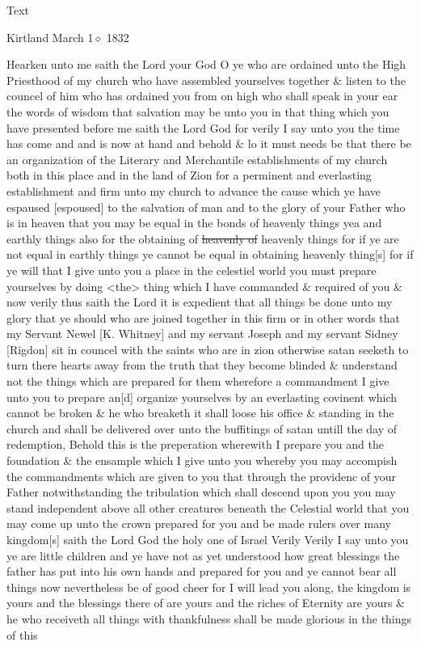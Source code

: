 			\begin{description}
				\item[Text]
			\end{description}
			
				\begin{tightcenter}
				Kirtland March 1$\diamond$ 1832
				\end{tightcenter}
				
				Hearken unto me saith the Lord your God O ye who are ordained unto the High Priesthood of my church who have assembled yourselves together \& listen to the councel of him who has ordained you from on high who shall speak in your ear the words of wisdom that salvation may be unto you in that thing which you have presented before me saith the Lord God for verily I say unto you the time has come and and is now at hand and behold \& lo it must needs be that there be an organization of the Literary and Merchantile establishments of my church both in this place and in the land of Zion for a perminent and everlasting establishment and firm unto my church to advance the cause which ye have espaused [espoused] to the salvation of man and to the glory of your Father who is in heaven that you may be equal in the bonds of heavenly things yea and earthly things also for the obtaining of \sout{heavenly of} heavenly things for if ye are not equal in earthly things ye cannot be equal in obtaining heavenly thing[s] for if ye will that I give unto you a place in the celestiel world you must prepare yourselves by doing <the> thing which I have commanded \& required of you \& now verily thus saith the Lord it is expedient that all things be done unto my glory that ye should who are joined together in this firm or in other words that my Servant Newel [K. Whitney] and my servant Joseph and my servant Sidney [Rigdon] sit in councel with the saints who are in zion otherwise satan seeketh to turn there hearts away from the truth that they become blinded \& understand not the things which are prepared for them wherefore a commandment I give unto you to prepare an[d] organize yourselves by an everlasting covinent which cannot be broken \& he who breaketh it shall loose his office \& standing in the church and shall be delivered over unto the buffitings of satan untill the day of redemption, Behold this is the preperation wherewith I prepare you and the foundation \& the ensample which I give unto you whereby you may accompish the commandments which are given to you that through the providenc of your Father notwithstanding the tribulation which shall descend upon you you may stand independent above all other creatures beneath the Celestial world that you may come up unto the crown prepared for you and be made rulers over many kingdom[s] saith the Lord God the holy one of Israel Verily Verily I say unto you ye are little children and ye have not as yet understood how great blessings the father has put into his own hands and prepared for you and ye cannot bear all things now nevertheless be of good cheer for I will lead you along, the kingdom is yours and the blessings there of are yours and the riches of Eternity are yours \& he who receiveth all things with thankfulness shall be made glorious in the things of this 
